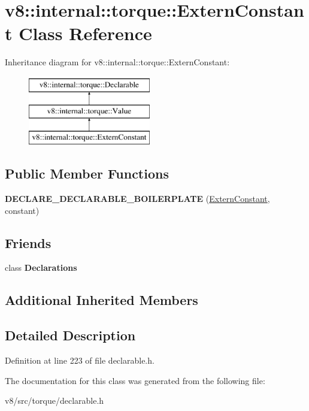 \hypertarget{classv8_1_1internal_1_1torque_1_1ExternConstant}{}\section{v8\+:\+:internal\+:\+:torque\+:\+:Extern\+Constant Class Reference}
\label{classv8_1_1internal_1_1torque_1_1ExternConstant}
Inheritance diagram for v8\+:\+:internal\+:\+:torque\+:\+:Extern\+Constant\+:\begin{figure}[H]
\begin{center}
\leavevmode
\includegraphics[height=3.000000cm]{classv8_1_1internal_1_1torque_1_1ExternConstant}
\end{center}
\end{figure}
\subsection*{Public Member Functions}
\begin{DoxyCompactItemize}
\item 
\mbox{\label{classv8_1_1internal_1_1torque_1_1ExternConstant_af9bae3537d9ea9b00dde59ba0409751b}} 
{\bfseries D\+E\+C\+L\+A\+R\+E\+\_\+\+D\+E\+C\+L\+A\+R\+A\+B\+L\+E\+\_\+\+B\+O\+I\+L\+E\+R\+P\+L\+A\+TE} (\mbox{\hyperlink{classv8_1_1internal_1_1torque_1_1ExternConstant}{Extern\+Constant}}, constant)
\end{DoxyCompactItemize}
\subsection*{Friends}
\begin{DoxyCompactItemize}
\item 
\mbox{\label{classv8_1_1internal_1_1torque_1_1ExternConstant_a23135931a5f054329315374b774718cf}} 
class {\bfseries Declarations}
\end{DoxyCompactItemize}
\subsection*{Additional Inherited Members}


\subsection{Detailed Description}


Definition at line 223 of file declarable.\+h.



The documentation for this class was generated from the following file\+:\begin{DoxyCompactItemize}
\item 
v8/src/torque/declarable.\+h\end{DoxyCompactItemize}
